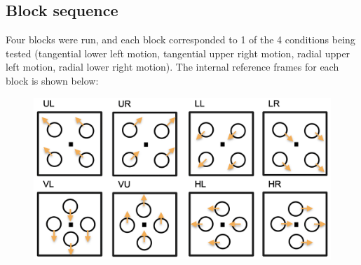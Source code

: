 \documentclass[11pt]{article} %
\begin{document}
\subsection{Block sequence}
Four blocks were run, and each block corresponded to 1 of the 4 conditions being tested (tangential lower left motion, tangential upper right motion, radial upper left motion, radial lower right motion). The internal reference frames for each block is shown below:

\begin{figure}[H]
\centering %
\includegraphics[scale=.4]{Images/Blocks.png}
\end{figure}
\end{document}
